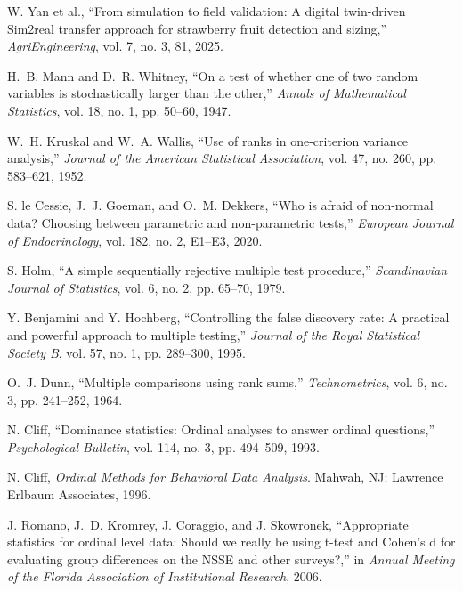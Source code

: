 \documentclass[12pt,a4paper,oneside]{book}
\begin{document}
\begin{enumerate}[label={[\arabic*]}, leftmargin=*]
\item \label{Yan2025} W. Yan et al., ``From simulation to field validation: A digital twin-driven Sim2real transfer approach for strawberry fruit detection and sizing,'' \emph{AgriEngineering}, vol. 7, no. 3, 81, 2025.

\item \label{Mann1947} H.~B. Mann and D.~R. Whitney, ``On a test of whether one of two random variables is stochastically larger than the other,'' \emph{Annals of Mathematical Statistics}, vol. 18, no. 1, pp. 50--60, 1947.

\item \label{Kruskal1952} W.~H. Kruskal and W.~A. Wallis, ``Use of ranks in one-criterion variance analysis,'' \emph{Journal of the American Statistical Association}, vol. 47, no. 260, pp. 583--621, 1952.

\item \label{leCessie2020} S. le Cessie, J.~J. Goeman, and O.~M. Dekkers, ``Who is afraid of non-normal data? Choosing between parametric and non-parametric tests,'' \emph{European Journal of Endocrinology}, vol. 182, no. 2, E1--E3, 2020.

\item \label{Holm1979} S. Holm, ``A simple sequentially rejective multiple test procedure,'' \emph{Scandinavian Journal of Statistics}, vol. 6, no. 2, pp. 65--70, 1979.

\item \label{Benjamini1995} Y. Benjamini and Y. Hochberg, ``Controlling the false discovery rate: A practical and powerful approach to multiple testing,'' \emph{Journal of the Royal Statistical Society B}, vol. 57, no. 1, pp. 289--300, 1995.

\item \label{Dunn1964} O.~J. Dunn, ``Multiple comparisons using rank sums,'' \emph{Technometrics}, vol. 6, no. 3, pp. 241--252, 1964.

\item \label{Cliff1993} N. Cliff, ``Dominance statistics: Ordinal analyses to answer ordinal questions,'' \emph{Psychological Bulletin}, vol. 114, no. 3, pp. 494--509, 1993.

\item \label{Cliff1996} N. Cliff, \emph{Ordinal Methods for Behavioral Data Analysis}. Mahwah, NJ: Lawrence Erlbaum Associates, 1996.

\item \label{Romano2006} J. Romano, J.~D. Kromrey, J. Coraggio, and J. Skowronek, ``Appropriate statistics for ordinal level data: Should we really be using t-test and Cohen's d for evaluating group differences on the NSSE and other surveys?,'' in \emph{Annual Meeting of the Florida Association of Institutional Research}, 2006.


\end{enumerate}
\end{document}
